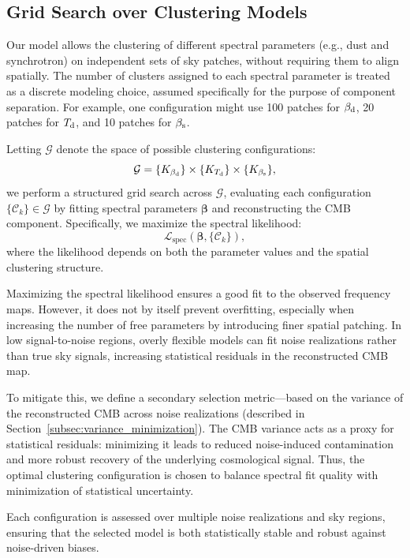 \documentclass[fleqn,usenatbib]{mnras}
\begin{document}
\subsection{Grid Search over Clustering Models}
\label{subsec:grid_search}

Our model allows the clustering of different spectral parameters (e.g., dust and synchrotron) on independent sets of sky patches, without requiring them to align spatially. The number of clusters assigned to each spectral parameter is treated as a discrete modeling choice, assumed specifically for the purpose of component separation. For example, one configuration might use 100 patches for \( \beta_{\rm d} \), 20 patches for \( T_{\rm d} \), and 10 patches for \( \beta_{\rm s} \).

Letting \( \mathcal{G} \) denote the space of possible clustering configurations:
\[
\mathcal{G} = \{K_{\beta_{\rm d}} \} \times \{ K_{T_{\rm d}} \} \times \{ K_{\beta_{\rm s}} \},
\]
we perform a structured grid search across \( \mathcal{G} \), evaluating each configuration \( \{ \mathcal{C}_k \} \in \mathcal{G} \) by fitting spectral parameters \( \boldsymbol{\beta} \) and reconstructing the CMB component. Specifically, we maximize the spectral likelihood:
\[
\mathcal{L}_{\text{spec}}(\boldsymbol{\beta}, \{ \mathcal{C}_k \}),
\]
where the likelihood depends on both the parameter values and the spatial clustering structure.

Maximizing the spectral likelihood ensures a good fit to the observed frequency maps. However, it does not by itself prevent overfitting, especially when increasing the number of free parameters by introducing finer spatial patching. In low signal-to-noise regions, overly flexible models can fit noise realizations rather than true sky signals, increasing statistical residuals in the reconstructed CMB map.

To mitigate this, we define a secondary selection metric—based on the variance of the reconstructed CMB across noise realizations (described in Section~\ref{subsec:variance_minimization}). The CMB variance acts as a proxy for statistical residuals: minimizing it leads to reduced noise-induced contamination and more robust recovery of the underlying cosmological signal. Thus, the optimal clustering configuration is chosen to balance spectral fit quality with minimization of statistical uncertainty.

Each configuration is assessed over multiple noise realizations and sky regions, ensuring that the selected model is both statistically stable and robust against noise-driven biases.
\end{document}
